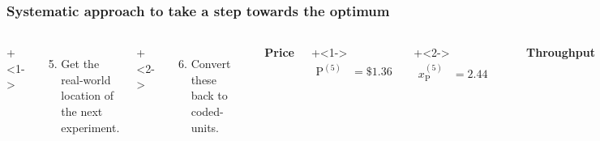 \begin{frame}\frametitle{Systematic approach to take a step towards the optimum}
	\begin{columns}[T]

			\vspace{1cm}
			\onslide+<1->{
				{\tiny 
					\begin{enumerate}\setcounter{enumi}{4}
						\item	Get the real-world location
						of the next experiment.
					\end{enumerate}
				
				\par}
			}
			
			\onslide+<2->{
				{\tiny 
					\begin{enumerate}\setcounter{enumi}{5}
						\item	Convert these back to coded-units.
					\end{enumerate}
				
				\par}
			}
			
				
			\rule[3mm]{0.01cm}{25mm}%
			
			
			\centerline{\textbf{Price}}
			
	
			\onslide+<1->{
				\begin{align*} 
					\text{P}^{(5)} &= \$1.36
				\end{align*}
			}
			
			\vspace{-1.1cm}
			\onslide+<2->{
				\begin{align*} 
					x_\text{P}^{(5)} &= 2.44
				\end{align*}
			}
			
			
			
		
			\rule[3mm]{0.01cm}{30mm}%
			
			\centerline{\textbf{Throughput}}
			
			\onslide+<1->{
				\begin{align*} 
					\text{T}^{(5)} &= 330 ~\text{parts per hour}
				\end{align*}
			}
			
			\vspace{-1.1cm}
			\onslide+<2->{	
				\begin{align*} 
					x_\text{T}^{(5)} &= 1.0
				\end{align*}
			}
	\end{columns}


\end{frame}

